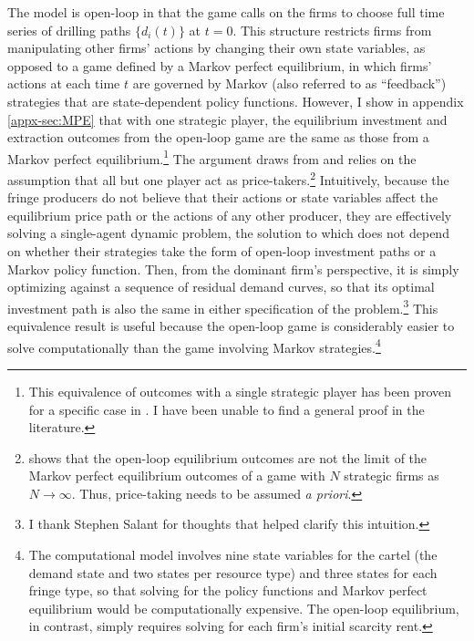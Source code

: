 \documentclass[12pt]{article}
\begin{document}
The model is open-loop in that the game calls on the firms to choose full time series of drilling paths $\{d_i(t)\}$ at $t=0$. This structure restricts firms from manipulating other firms' actions by changing their own state variables, as opposed to a game defined by a Markov perfect equilibrium, in which firms' actions at each time $t$ are governed by Markov (also referred to as ``feedback'') strategies that are state-dependent policy functions. However, I show in appendix \ref{appx-sec:MPE} that with one strategic player, the equilibrium investment and extraction outcomes from the open-loop game are the same as those from a Markov perfect equilibrium.\footnote{This equivalence of outcomes with a single strategic player has been proven for a specific case in \cite{benchekrounwithagen2012}. I have been unable to find a general proof in the literature.} The argument draws from \cite{eswaranlewis1985} and relies on the assumption that all but one player act as price-takers.\footnote{\cite{benchekrounwithagen2012} shows that the open-loop equilibrium outcomes are not the limit of the Markov perfect equilibrium outcomes of a game with $N$ strategic firms as $N\to\infty$. Thus, price-taking needs to be assumed \emph{a priori}.} Intuitively, because the fringe producers do not believe that their actions or state variables affect the equilibrium price path or the actions of any other producer, they are effectively solving a single-agent dynamic problem, the solution to which does not depend on whether their strategies take the form of open-loop investment paths or a Markov policy function. Then, from the dominant firm's perspective, it is simply optimizing against a sequence of residual demand curves, so that its optimal investment path is also the same in either specification of the problem.\footnote{I thank Stephen Salant for thoughts that helped clarify this intuition.} This equivalence result is useful because the open-loop game is considerably easier to solve computationally than the game involving Markov strategies.\footnote{The computational model involves nine state variables for the cartel (the demand state and two states per resource type) and three states for each fringe type, so that solving for the policy functions and Markov perfect equilibrium would be computationally expensive. The open-loop equilibrium, in contrast, simply requires solving for each firm's initial scarcity rent.}
\end{document}
